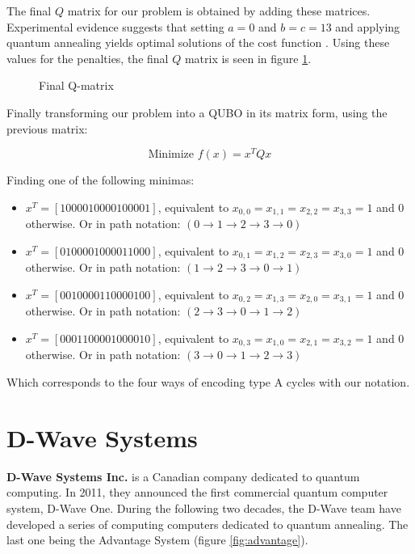 The final $Q$ matrix for our problem is obtained by adding these matrices. Experimental evidence suggests that setting $a = 0$ and $b = c = 13$ and applying quantum annealing yields optimal solutions of the cost function \cite{Sarkar2020}. Using these values for the penalties, the final $Q$ matrix is seen in figure \ref{fig:salesman-Q-matrix}.

\begin{figure}[H]
	\centering
	\caption{Final Q-matrix \cite{Sarkar2020}}
	\label{fig:salesman-Q-matrix}
\end{figure}

Finally transforming our problem into a QUBO in its matrix form, using the previous matrix:

$$ \text{Minimize } f(x) = x^T Q x $$

Finding one of the following minimas:

\begin{itemize}
	\item $x^T = [1000010000100001]$, equivalent to $x_{0,0} = x_{1,1} = x_{2,2} = x_{3,3} = 1$ and $0$ otherwise. Or in path notation: $(0 \rightarrow 1 \rightarrow 2 \rightarrow 3 \rightarrow 0)$
	\item $x^T = [0100001000011000]$, equivalent to $x_{0,1} = x_{1,2} = x_{2,3} = x_{3,0} = 1$ and $0$ otherwise. Or in path notation: $(1 \rightarrow 2 \rightarrow 3 \rightarrow 0 \rightarrow 1)$
	\item $x^T = [0010000110000100]$, equivalent to $x_{0,2} = x_{1,3} = x_{2,0} = x_{3,1} = 1$ and $0$ otherwise. Or in path notation: $(2 \rightarrow 3 \rightarrow 0 \rightarrow 1 \rightarrow 2)$
	\item $x^T = [0001100001000010]$, equivalent to $x_{0,3} = x_{1,0} = x_{2,1} = x_{3,2} = 1$ and $0$ otherwise. Or in path notation: $(3 \rightarrow 0 \rightarrow 1 \rightarrow 2 \rightarrow 3)$
\end{itemize}

Which corresponds to the four ways of encoding type A cycles with our notation.


\section{D-Wave Systems}


\textbf{D-Wave Systems Inc.} is a Canadian company dedicated to quantum computing. In 2011, they announced the first commercial quantum computer system, D-Wave One. During the following two decades, the D-Wave team have developed a series of computing computers dedicated to quantum annealing. The last one being the Advantage System (figure \ref{fig:advantage}).


